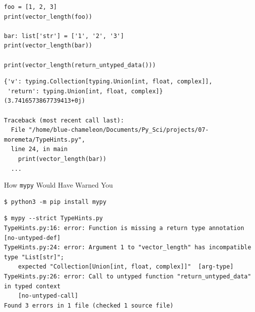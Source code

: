 
\begin{frame}[fragile]
%
\begin{codebox}
\begin{verbatim}
foo = [1, 2, 3]
print(vector_length(foo))

bar: list['str'] = ['1', '2', '3']
print(vector_length(bar))

print(vector_length(return_untyped_data()))
\end{verbatim}
\end{codebox}
%
\begin{cmdbox}
\begin{verbatim}
{'v': typing.Collection[typing.Union[int, float, complex]], 
 'return': typing.Union[int, float, complex]}
(3.7416573867739413+0j)

Traceback (most recent call last):
  File "/home/blue-chameleon/Documents/Py_Sci/projects/07-moremeta/TypeHints.py", 
  line 24, in main
    print(vector_length(bar))
  ...
\end{verbatim}
\end{cmdbox}
%
\end{frame}


\begin{frame}[fragile]{How \texttt{mypy} Would Have Warned You}
%
\begin{cmdbox}
\begin{verbatim}
$ python3 -m pip install mypy
\end{verbatim}
\end{cmdbox}
%
\begin{cmdbox}
\begin{verbatim}
$ mypy --strict TypeHints.py 
TypeHints.py:16: error: Function is missing a return type annotation  [no-untyped-def]
TypeHints.py:24: error: Argument 1 to "vector_length" has incompatible type "List[str]"; 
    expected "Collection[Union[int, float, complex]]"  [arg-type]
TypeHints.py:26: error: Call to untyped function "return_untyped_data" in typed context
    [no-untyped-call]
Found 3 errors in 1 file (checked 1 source file)
\end{verbatim}
\end{cmdbox}
%
\end{frame}

